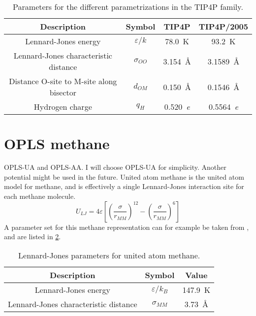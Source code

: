 \begin{table}
\caption{Parameters for the different parametrizations in the TIP4P family.}
\label{tbl:tip4p_parameters}
\begin{tabular}{c|c|c|c}
Description & Symbol & TIP4P & TIP4P/2005 \\ 
\hline
Lennard-Jones energy & $\varepsilon/k$ & \SI{78.0}{\kelvin} & \SI{93.2}{\kelvin} \\
Lennard-Jones characteristic distance & $\sigma_{OO}$ & \SI{3.154}{\angstrom} & \SI{3.1589}{\angstrom} \\
Distance O-site to M-site along bisector & $d_{OM}$ & \SI{0.150}{\angstrom} & \SI{0.1546}{\angstrom} \\
Hydrogen charge & $q_H$ & \SI{0.520}{\elementarycharge} & \SI{0.5564}{\elementarycharge} \\
\end{tabular}
\end{table}

\section{OPLS methane}
OPLS-UA and OPLS-AA. I will choose OPLS-UA for simplicity. Another potential might be used in the future. 
United atom methane is the united atom model for methane, and is effectively a single Lennard-Jones interaction site for each methane molecule. 
\begin{equation}
	U_{LJ} = 4\varepsilon\left[\left(\frac{\sigma}{r_{MM}}\right)^{12} - \left(\frac{\sigma}{r_{MM}}\right)^{6}\right]
	\label{eq:part1:lennardjonespotentialmethane}
\end{equation}
A parameter set for this methane representation can for example be taken from \cite{Martin1998}, and are listed in \ref{tb:parameters_unitedatommethane}. 

\begin{table}
\caption{Lennard-Jones parameters for united atom methane.}
\label{tb:parameters_unitedatommethane}
\begin{center}
\begin{tabular}{c|c|c}
Description & Symbol & Value \\
\hline
Lennard-Jones energy & $\varepsilon/k_B$ & \SI{147.9}{\kelvin} \\
Lennard-Jones characteristic distance & $\sigma_{MM}$ & \SI{3.73}{\angstrom}
\end{tabular}
\end{center}
\end{table}


